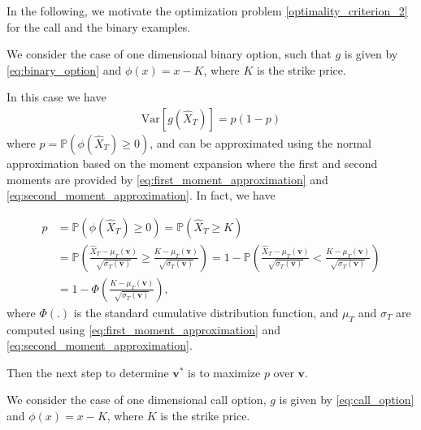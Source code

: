 In the following, we motivate the optimization problem \eqref{optimality_criterion_2} for the call and the binary examples.
\begin{example}
We consider the case of one dimensional binary option, such that $g$ is given by \eqref{eq:binary_option} and  $\phi(x)=x-K$, where $K$ is the strike price.  

In this case we have
\begin{align*}
\text{Var}\left[g(\widehat{X}_T)\right]= p (1-p)
\end{align*}
where $p= \mathbb{P}(\phi(\widehat{X}_T) \ge 0)$, and can be approximated using the normal approximation based on the moment expansion where the first and second moments are provided by  \eqref{eq:first_moment_approximation} and \eqref{eq:second_moment_approximation}. In fact, we have

\begin{align*}
p&= \mathbb{P}\left(\phi(\widehat{X}_T) \ge 0\right)=\mathbb{P}\left(\widehat{X}_T \ge K\right) \nonumber\\
&=\mathbb{P}\left(\frac{\widehat{X}_T- \mu_T(\mathbf{v})}{\sqrt{\sigma_T(\mathbf{v})}} \ge \frac{K-\mu_T(\mathbf{v})}{\sqrt{\sigma_T(\mathbf{v})}} \right)=1-\mathbb{P}\left(\frac{\widehat{X}_T- \mu_T(\mathbf{v})}{\sqrt{\sigma_T(\mathbf{v})}} < \frac{K-\mu_T(\mathbf{v})}{\sqrt{\sigma_T(\mathbf{v})}} \right) \nonumber\\
&=1- \Phi\left(\frac{K-\mu_T(\mathbf{v})}{\sqrt{\sigma_T(\mathbf{v})}} \right),
\end{align*}
where $\Phi(.)$ is the standard cumulative distribution function, and $\mu_T$ and $\sigma_T$ are computed using \eqref{eq:first_moment_approximation} and \eqref{eq:second_moment_approximation}. 

Then  the next step to determine $\mathbf{v}^\ast$ is to maximize $p$  over $\mathbf{v}$.

\end{example} 
\begin{example}
We consider the case of one dimensional call option,  $g$ is given by \eqref{eq:call_option} and $\phi(x)=x-K$, where $K$ is the strike price. 
\end{example} 

